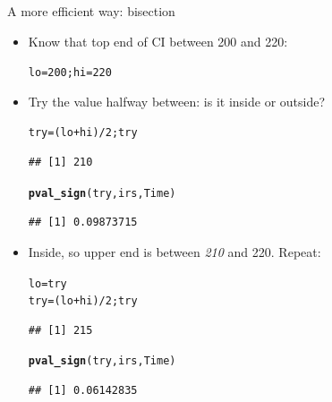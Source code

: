 \documentclass[unknownkeysallowed]{beamer}\usepackage[]{graphicx}\usepackage[]{color}
\makeatletter
\newcommand{\hlnum}[1]{\textcolor[rgb]{0.686,0.059,0.569}{#1}}%
\newcommand{\hlopt}[1]{\textcolor[rgb]{0,0,0}{#1}}%
\newcommand{\hlstd}[1]{\textcolor[rgb]{0.345,0.345,0.345}{#1}}%
\newcommand{\hlkwb}[1]{\textcolor[rgb]{0.69,0.353,0.396}{#1}}%
\newcommand{\hlkwd}[1]{\textcolor[rgb]{0.737,0.353,0.396}{\textbf{#1}}}%
\newenvironment{kframe}{%
 \def\at@end@of@kframe{}%
 \ifinner\ifhmode%
  \def\at@end@of@kframe{\end{minipage}}%
  \begin{minipage}{\columnwidth}%
 \fi\fi%
 \def\FrameCommand##1{\hskip\@totalleftmargin \hskip-\fboxsep
 \colorbox{shadecolor}{##1}\hskip-\fboxsep
     \hskip-\linewidth \hskip-\@totalleftmargin \hskip\columnwidth}%
 \MakeFramed {\advance\hsize-\width
   \@totalleftmargin\z@ \linewidth\hsize
   \@setminipage}}%
 {\par\unskip\endMakeFramed%
 \at@end@of@kframe}
\newenvironment{knitrout}{}{} %
\makeatother
\begin{document}
\begin{frame}[fragile]{A more efficient way: bisection}
  
  \begin{itemize}
  \item Know that top end of CI between 200 and 220:
    
\begin{knitrout}
\color{fgcolor}\begin{kframe}
\begin{alltt}
\hlstd{lo}\hlkwb{=}\hlnum{200} \hlstd{; hi}\hlkwb{=}\hlnum{220}
\end{alltt}
\end{kframe}
\end{knitrout}
\item Try the value halfway between: is it inside or outside?

  \begin{small}
\begin{knitrout}
\color{fgcolor}\begin{kframe}
\begin{alltt}
\hlstd{try}\hlkwb{=}\hlstd{(lo}\hlopt{+}\hlstd{hi)}\hlopt{/}\hlnum{2} \hlstd{; try}
\end{alltt}
\begin{verbatim}
## [1] 210
\end{verbatim}
\begin{alltt}
\hlkwd{pval_sign}\hlstd{(try,irs,Time)}
\end{alltt}
\begin{verbatim}
## [1] 0.09873715
\end{verbatim}
\end{kframe}
\end{knitrout}
    
  \end{small}
\item Inside, so upper end is between \emph{210} and 220. Repeat:

  \begin{small}
\begin{knitrout}
\color{fgcolor}\begin{kframe}
\begin{alltt}
\hlstd{lo}\hlkwb{=}\hlstd{try}
\hlstd{try}\hlkwb{=}\hlstd{(lo}\hlopt{+}\hlstd{hi)}\hlopt{/}\hlnum{2} \hlstd{; try}
\end{alltt}
\begin{verbatim}
## [1] 215
\end{verbatim}
\begin{alltt}
\hlkwd{pval_sign}\hlstd{(try,irs,Time)}
\end{alltt}
\begin{verbatim}
## [1] 0.06142835
\end{verbatim}
\end{kframe}
\end{knitrout}
  \end{small}
  \end{itemize}
  
\end{frame}
\end{document}
